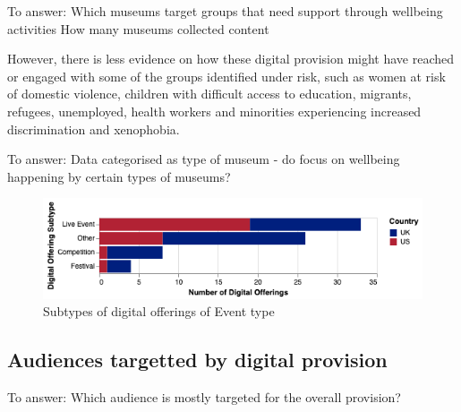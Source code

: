 \documentclass{egpubl}
\begin{document}
\color{red}To answer:
Which museums target groups that need support through wellbeing activities
How many museums collected content 
\color{black}

However, there is less evidence on how these digital provision might have reached or engaged with some of the groups identified under risk, such as women at risk of domestic violence, children with difficult access to education, migrants, refugees, unemployed, health workers and minorities experiencing increased discrimination and xenophobia. 

\color{red}To answer: Data  categorised  as  type of museum - do focus on wellbeing happening by certain types of museums?\color{black}

\begin{figure}[h]
  \centering
  \includegraphics[width=\linewidth]{images/event.png}
  \caption{\label{fig:DigOffType3} 
           Subtypes of digital offerings of Event type}
\end{figure}

\subsection{Audiences targetted by digital provision}
\color{red}To answer: Which audience is mostly targeted for the overall provision?\color{black}


\end{document}

